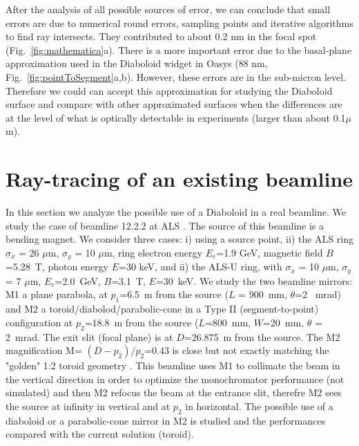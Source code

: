 \documentclass{iucr}              %
\begin{document}
After the analysis of all possible sources of error, we can conclude that small errors are due to numerical round errors, sampling points and iterative algorithms to find ray intersects. They contributed to about 0.2 nm in the focal spot (Fig.~\ref{fig:mathematica}a). There is a more important error due to the basal-plane approximation used in the Diaboloid widget in Oasys (88 nm, Fig.~\ref{fig:pointToSegment}a,b). However, these errors are in the sub-micron level. Therefore we could can accept this approximation for studying the Diaboloid surface and compare with other approximated surfaces when the differences are at the level of what is optically detectable in experiments (larger than about 0.1$\mu$m).

\section{Ray-tracing of an existing beamline}
\label{sec:beamline}

In this section we analyze the possible use of a Diaboloid in a real beamline. We study the case of beamline 12.2.2  at ALS \cite{bl1222} \cite{MacDowell2004}. The source of this beamline is a bending magnet. We consider three cases: i) using a source point, ii) the ALS ring
$\sigma_x$ = 26 $\mu$m, $\sigma_y$ = 10 $\mu$m, ring electron energy $E_e$=1.9 GeV, magnetic field $B$=5.28~T, photon energy $E$=30 keV, and ii) the ALS-U ring, with $\sigma_x$ = 10 $\mu$m, $\sigma_y$ = 7 $\mu$m, $E_e$=2.0~GeV, $B$=3.1~T, $E$=30~keV. We study the two beamline mirrors: M1 a plane parabola, at $p_1$=6.5~m from the source ($L$ = 900~mm, $\theta$=2 ~mrad) and M2 a toroid/diabolod/parabolic-cone in a Type II (segment-to-point) configuration at $p_2$=18.8~m from the source ($L$=800~mm, $W$=20~mm, $\theta$ = 2~mrad. The exit slit (focal plane) is at $D$=26.875~m from the source.  The M2 magnification M= $(D-p_2)/p_2$=0.43 is close but not exactly matching the "golden" 1:2 toroid geometry \cite{padmore2000, howells2000}. This beamline uses M1 to collimate the beam in the vertical direction in order to optimize the monochromator performance (not simulated) and then M2 refocus the beam at the entrance slit, therefre M2 sees the source at infinity in vertical and at $p_2$ in horizontal. The possible use of a diaboloid or a parabolic-cone mirror in M2 is studied and the performances compared with the current solution (toroid).
\end{document}

